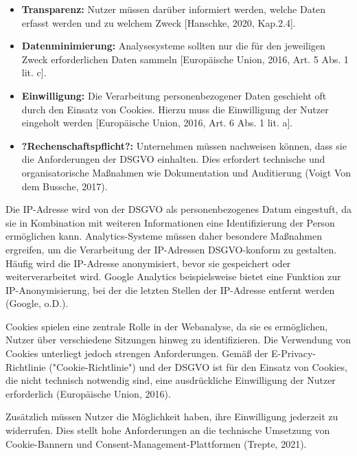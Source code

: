 \begin{itemize}
    \item \textbf{Transparenz:} Nutzer müssen darüber informiert werden, welche Daten erfasst werden und zu welchem Zweck [Hanschke, 2020, Kap.2.4].
    \item \textbf{Datenminimierung:} Analysesysteme sollten nur die für den jeweiligen Zweck erforderlichen Daten sammeln [Europäische Union, 2016, Art. 5 Abs. 1 lit. c].
    \item \textbf{Einwilligung:} Die Verarbeitung personenbezogener Daten geschieht oft durch den Einsatz von Cookies. Hierzu muss die Einwilligung der Nutzer eingeholt werden [Europäische Union, 2016, Art. 6 Abs. 1 lit. a]. 
    \item \textbf{?Rechenschaftspflicht?:} Unternehmen müssen nachweisen können, dass sie die Anforderungen der DSGVO einhalten. Dies erfordert technische und organisatorische Maßnahmen wie Dokumentation und Auditierung (Voigt Von dem Bussche, 2017).
\end{itemize}

Die IP-Adresse wird von der DSGVO als personenbezogenes Datum eingestuft, da sie in Kombination mit weiteren Informationen eine Identifizierung der Person ermöglichen kann. Analytics-Systeme müssen daher besondere Maßnahmen ergreifen, um die Verarbeitung der IP-Adressen DSGVO-konform zu gestalten. Häufig wird die IP-Adresse anonymisiert, bevor sie gespeichert oder weiterverarbeitet wird. Google Analytics beispielsweise bietet eine Funktion zur IP-Anonymisierung, bei der die letzten Stellen der IP-Adresse entfernt werden (Google, o.D.). %

Cookies spielen eine zentrale Rolle in der Webanalyse, da sie es ermöglichen, Nutzer über verschiedene Sitzungen hinweg zu identifizieren. Die Verwendung von Cookies unterliegt jedoch strengen Anforderungen. Gemäß der E-Privacy-Richtlinie ("Cookie-Richtlinie") und der DSGVO ist für den Einsatz von Cookies, die nicht technisch notwendig sind, eine ausdrückliche Einwilligung der Nutzer erforderlich (Europäische Union, 2016). %

Zusätzlich müssen Nutzer die Möglichkeit haben, ihre Einwilligung jederzeit zu widerrufen. Dies stellt hohe Anforderungen an die technische Umsetzung von Cookie-Bannern und Consent-Management-Plattformen (Trepte, 2021).

